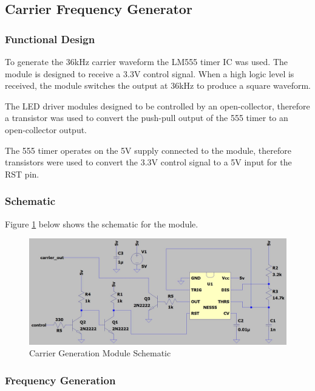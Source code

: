 


\subsection{Carrier Frequency Generator}
\subsubsection{Functional Design}
To generate the 36kHz carrier waveform the LM555 timer IC was used. The module is designed to receive a 3.3V control signal. When a high logic level is received, the module switches the output at 36kHz to produce a square waveform.

The LED driver modules designed to be controlled by an open-collector, therefore a transistor was used to convert the push-pull output of the 555 timer to an open-collector output.

The 555 timer operates on the 5V supply connected to the module, therefore transistors were used to convert the 3.3V control signal to a 5V input for the RST pin.

\subsubsection{Schematic}
Figure \ref{fig:schematic_carrier_generation} below shows the schematic for the module.

\begin{figure}[H]
	\centering
	\includegraphics[width=.8\textwidth]{figures/design/carrier_waveform_generator_555.JPG}
	\caption{Carrier Generation Module Schematic}
	\label{fig:schematic_carrier_generation}
\end{figure}

\subsubsection{Frequency Generation}

